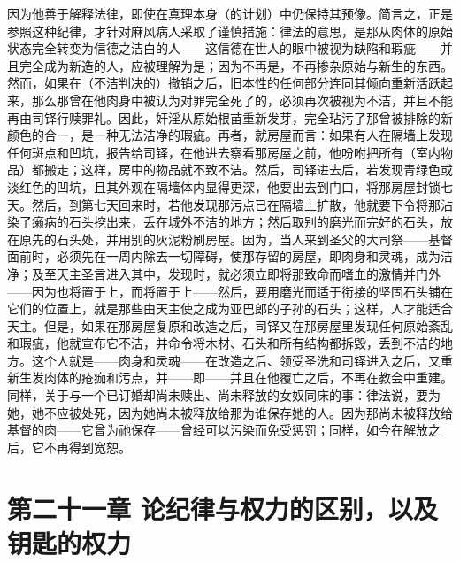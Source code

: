 因为他善于解释法律，即使在真理本身（的计划）中仍保持其预像。简言之，正是参照这种纪律，才针对麻风病人采取了谨慎措施：律法的意思，是那从肉体的原始状态完全转变为信德之洁白的人——这信德在世人的眼中被视为缺陷和瑕疵——并且完全成为新造的人，应被理解为是；因为不再是，不再掺杂原始与新生的东西。然而，如果在（不洁判决的）撤销之后，旧本性的任何部分连同其倾向重新活跃起来，那么那曾在他肉身中被认为对罪完全死了的，必须再次被视为不洁，并且不能再由司铎行赎罪礼。因此，奸淫从原始根苗重新发芽，完全玷污了那曾被排除的新颜色的合一，是一种无法洁净的瑕疵。再者，就房屋而言：如果有人在隔墙上发现任何斑点和凹坑，报告给司铎，在他进去察看那房屋之前，他吩咐把所有（室内物品）都搬走；这样，房中的物品就不致不洁。然后，司铎进去后，若发现青绿色或淡红色的凹坑，且其外观在隔墙体内显得更深，他要出去到门口，将那房屋封锁七天。然后，到第七天回来时，若他发现那污点已在隔墙上扩散，他就要下令将那沾染了癞病的石头挖出来，丢在城外不洁的地方；然后取别的磨光而完好的石头，放在原先的石头处，并用别的灰泥粉刷房屋。因为，当人来到圣父的大司祭——基督面前时，必须先在一周内除去一切障碍，使那存留的房屋，即肉身和灵魂，成为洁净；及至天主圣言进入其中，发现时，就必须立即将那致命而嗜血的激情并门外——因为也将置于上，而将置于上——然后，要用磨光而适于衔接的坚固石头铺在它们的位置上，就是那些由天主使之成为亚巴郎的子孙的石头；这样，人才能适合天主。但是，如果在那房屋复原和改造之后，司铎又在那房屋里发现任何原始紊乱和瑕疵，他就宣布它不洁，并命令将木材、石头和所有结构都拆毁，丢到不洁的地方。这个人就是——肉身和灵魂——在改造之后、领受圣洗和司铎进入之后，又重新生发肉体的疮痂和污点，并——即——并且在他覆亡之后，不再在教会中重建。同样，关于与一个已订婚却尚未赎出、尚未释放的女奴同床的事：律法说，要为她，她不应被处死，因为她尚未被释放给那为谁保存她的人。因为那尚未被释放给基督的肉——它曾为祂保存——曾经可以污染而免受惩罚；同样，如今在解放之后，它不再得到宽恕。\par


\section{第二十一章 论纪律与权力的区别，以及钥匙的权力}

